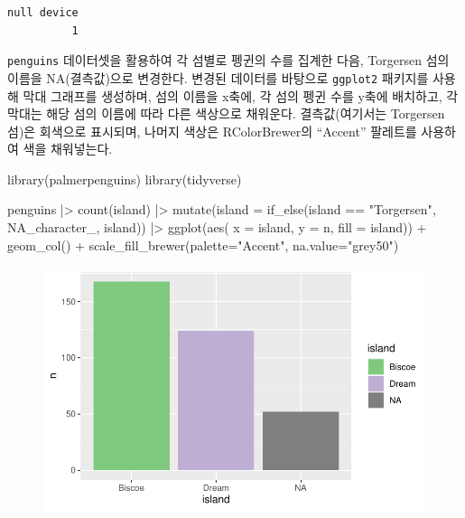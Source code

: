 \documentclass[
  letterpaper,
]{book}
\newenvironment{Shaded}{\begin{snugshade}}{\end{snugshade}}
\newcommand{\AttributeTok}[1]{\textcolor[rgb]{0.40,0.45,0.13}{#1}}
\newcommand{\ConstantTok}[1]{\textcolor[rgb]{0.56,0.35,0.01}{#1}}
\newcommand{\FunctionTok}[1]{\textcolor[rgb]{0.28,0.35,0.67}{#1}}
\newcommand{\NormalTok}[1]{\textcolor[rgb]{0.00,0.23,0.31}{#1}}
\newcommand{\SpecialCharTok}[1]{\textcolor[rgb]{0.37,0.37,0.37}{#1}}
\newcommand{\StringTok}[1]{\textcolor[rgb]{0.13,0.47,0.30}{#1}}
\begin{document}
\begin{verbatim}
null device 
          1 
\end{verbatim}

\texttt{penguins} 데이터셋을 활용하여 각 섬별로 펭귄의 수를 집계한 다음,
Torgersen 섬의 이름을 NA(결측값)으로 변경한다. 변경된 데이터를 바탕으로
\texttt{ggplot2} 패키지를 사용해 막대 그래프를 생성하며, 섬의 이름을
x축에, 각 섬의 펭귄 수를 y축에 배치하고, 각 막대는 해당 섬의 이름에 따라
다른 색상으로 채워운다. 결측값(여기서는 Torgersen 섬)은 회색으로
표시되며, 나머지 색상은 RColorBrewer의 ``Accent'' 팔레트를 사용하여 색을
채워넣는다.

\begin{Shaded}
\begin{Highlighting}[]
\FunctionTok{library}\NormalTok{(palmerpenguins)}
\FunctionTok{library}\NormalTok{(tidyverse)}

\NormalTok{penguins }\SpecialCharTok{|\textgreater{}} 
  \FunctionTok{count}\NormalTok{(island) }\SpecialCharTok{|\textgreater{}} 
  \FunctionTok{mutate}\NormalTok{(}\AttributeTok{island =} \FunctionTok{if\_else}\NormalTok{(island }\SpecialCharTok{==}  \StringTok{"Torgersen"}\NormalTok{, }\ConstantTok{NA\_character\_}\NormalTok{, island)) }\SpecialCharTok{|\textgreater{}} 
  \FunctionTok{ggplot}\NormalTok{(}\FunctionTok{aes}\NormalTok{( }\AttributeTok{x =}\NormalTok{ island, }\AttributeTok{y =}\NormalTok{ n, }\AttributeTok{fill =}\NormalTok{ island)) }\SpecialCharTok{+}
    \FunctionTok{geom\_col}\NormalTok{() }\SpecialCharTok{+}
    \FunctionTok{scale\_fill\_brewer}\NormalTok{(}\AttributeTok{palette=}\StringTok{"Accent"}\NormalTok{, }\AttributeTok{na.value=}\StringTok{"grey50"}\NormalTok{)}
\end{Highlighting}
\end{Shaded}

\begin{figure}[H]

{\centering \includegraphics{colors_files/figure-pdf/unnamed-chunk-3-1.pdf}

}

\end{figure}
\end{document}
